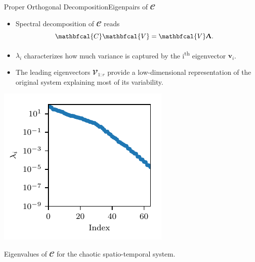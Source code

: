 \documentclass[usenames,dvipsnames,svgnames,10pt,aspectratio=169]{beamer}
\begin{document}
\begin{frame}[t, c]{Proper Orthogonal Decomposition}{Eigenpairs of $\mathbfcal{C}$}
	\begin{minipage}{.48\textwidth}
		\begin{itemize}
			\item Spectral decomposition of $\mathbfcal{C}$ reads
			$$\mathbfcal{C} \mathbfcal{V} = \mathbfcal{V} \boldsymbol{\Uplambda}.$$

			\bigskip

			\item $\lambda_i$ characterizes how much variance is captured by the i\textsuperscript{th} eigenvector $\mathbf{v}_i$.

			\bigskip

			\item The leading eigenvectors $\mathbfcal{V}_{1:r}$ provide a low-dimensional representation of the original system explaining most of its variability.
		\end{itemize}
	\end{minipage}%
	\begin{minipage}{.48\textwidth}
		\centering
		\includegraphics[width=.66\textwidth]{kuramoto_sivashinky_temporal_correlation_eigenvalues}

		{\small Eigenvalues of $\mathbfcal{C}$ for the chaotic spatio-temporal system.}
	\end{minipage}

	\vspace{1cm}
\end{frame}
\end{document}
